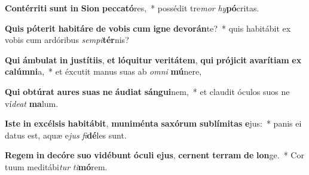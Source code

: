\item \textbf{Con}\textbf{tér}\textbf{ri}\textbf{ti} \textbf{sunt} \textbf{in} \textbf{Si}\textbf{on} \textbf{pec}\textbf{ca}\textbf{tó}res,~* possédit tre\textit{mor} \textit{hy}\textbf{pó}critas.
\item \textbf{Quis} \textbf{pót}\textbf{e}\textbf{rit} \textbf{ha}\textbf{bi}\textbf{tá}\textbf{re} \textbf{de} \textbf{vo}\textbf{bis} \textbf{cum} \textbf{i}\textbf{gne} \textbf{de}\textbf{vo}\textbf{rán}te?~* quis habitábit ex vobis cum ardóribus \textit{sem}\textit{pi}\textbf{tér}nis?
\item \textbf{Qui} \textbf{ám}\textbf{bu}\textbf{lat} \textbf{in} \textbf{jus}\textbf{tí}\textbf{ti}\textbf{is}, \textbf{et} \textbf{ló}\textbf{qui}\textbf{tur} \textbf{ve}\textbf{ri}\textbf{tá}\textbf{tem}, \textbf{qui} \textbf{pró}\textbf{ji}\textbf{cit} \textbf{a}\textbf{va}\textbf{rí}\textbf{ti}\textbf{am} \textbf{ex} \textbf{ca}\textbf{lúm}\textbf{ni}a,~* et éxcutit manus suas ab \textit{om}\textit{ni} \textbf{mú}nere,
\item \textbf{Qui} \textbf{ob}\textbf{tú}\textbf{rat} \textbf{au}\textbf{res} \textbf{su}\textbf{as} \textbf{ne} \textbf{áu}\textbf{di}\textbf{at} \textbf{sán}\textbf{gui}nem,~* et claudit óculos suos ne ví\textit{de}\textit{at} \textbf{ma}lum.
\item \textbf{Is}\textbf{te} \textbf{in} \textbf{ex}\textbf{cél}\textbf{sis} \textbf{ha}\textbf{bi}\textbf{tá}\textbf{bit}, \textbf{mu}\textbf{ni}\textbf{mén}\textbf{ta} \textbf{sa}\textbf{xó}\textbf{rum} \textbf{sub}\textbf{lí}\textbf{mi}\textbf{tas} \textbf{e}jus:~* panis ei datus est, aquæ e\textit{jus} \textit{fi}\textbf{dé}les sunt.
\item \textbf{Re}\textbf{gem} \textbf{in} \textbf{de}\textbf{có}\textbf{re} \textbf{su}\textbf{o} \textbf{vi}\textbf{dé}\textbf{bunt} \textbf{ó}\textbf{cu}\textbf{li} \textbf{e}\textbf{jus}, \textbf{cer}\textbf{nent} \textbf{ter}\textbf{ram} \textbf{de} \textbf{lon}ge.~* Cor tuum meditábi\textit{tur} \textit{ti}\textbf{mó}rem.
